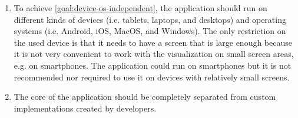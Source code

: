 \begin{enumerate}[label=\textbf{OR \arabic*}., ref=OR \arabic*, labelindent=0.5cm, leftmargin=*]
	\item \label{or:device-os-independent}
		To achieve \ref{goal:device-os-independent}, the application should run on different kinds of devices (i.e. tablets, laptops, and desktops) and operating systems (i.e. Android, iOS, MacOS, and Windows). The only restriction on the used device is that it needs to have a screen that is large enough because it is not very convenient to work with the visualization on small screen areas, e.g. on smartphones. The application could run on smartphones but it is not recommended nor required to use it on devices with relatively small screens.
	
	\item \label{item:code-separation}
		The core of the application should be completely separated from custom implementations created by developers.

\end{enumerate}
